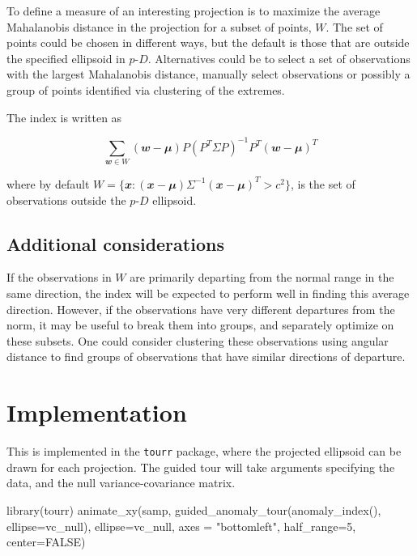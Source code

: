\documentclass[
  12pt]{article}
\newenvironment{Shaded}{\begin{snugshade}}{\end{snugshade}}
\newcommand{\AttributeTok}[1]{\textcolor[rgb]{0.40,0.45,0.13}{#1}}
\newcommand{\ConstantTok}[1]{\textcolor[rgb]{0.56,0.35,0.01}{#1}}
\newcommand{\DecValTok}[1]{\textcolor[rgb]{0.68,0.00,0.00}{#1}}
\newcommand{\FunctionTok}[1]{\textcolor[rgb]{0.28,0.35,0.67}{#1}}
\newcommand{\NormalTok}[1]{\textcolor[rgb]{0.00,0.23,0.31}{#1}}
\newcommand{\StringTok}[1]{\textcolor[rgb]{0.13,0.47,0.30}{#1}}
\newcommand\pD{$p\text{-}D$}
\begin{document}
To define a measure of an interesting projection is to maximize the
average Mahalanobis distance \citep{mahalanobis} in the projection for a
subset of points, \(W\). The set of points could be chosen in different
ways, but the default is those that are outside the specified ellipsoid
in \pD{}. Alternatives could be to select a set of observations with the
largest Mahalanobis distance, manually select observations or possibly a
group of points identified via clustering of the extremes.

The index is written as

\[
\sum_{\mathbfit{w} \in W} (\mathbfit{w} - \mathbfit{\mu}) P (P^T\Sigma P)^{-1}P^T(\mathbfit{w} - \mathbfit{\mu})^T
\]

where by default
\(W = \{\mathbfit{x}: (\mathbfit{x}-\mathbfit{\mu}) \Sigma^{-1}(\mathbfit{x}-\mathbfit{\mu})^T > c^2\}\),
is the set of observations outside the \pD{} ellipsoid.

\subsection{Additional considerations}\label{additional-considerations}

If the observations in \(W\) are primarily departing from the normal
range in the same direction, the index will be expected to perform well
in finding this average direction. However, if the observations have
very different departures from the norm, it may be useful to break them
into groups, and separately optimize on these subsets. One could
consider clustering these observations using angular distance to find
groups of observations that have similar directions of departure.

\section{Implementation}\label{implementation}

This is implemented in the \texttt{tourr} \citep{tourr, tourr-cran}
package, where the projected ellipsoid can be drawn for each projection.
The guided tour will take arguments specifying the data, and the null
variance-covariance matrix.

\begin{Shaded}
\begin{Highlighting}[]
\FunctionTok{library}\NormalTok{(tourr)}
\FunctionTok{animate\_xy}\NormalTok{(samp, }\FunctionTok{guided\_anomaly\_tour}\NormalTok{(}\FunctionTok{anomaly\_index}\NormalTok{(),}
  \AttributeTok{ellipse=}\NormalTok{vc\_null), }\AttributeTok{ellipse=}\NormalTok{vc\_null, }
  \AttributeTok{axes =} \StringTok{"bottomleft"}\NormalTok{, }\AttributeTok{half\_range=}\DecValTok{5}\NormalTok{, }\AttributeTok{center=}\ConstantTok{FALSE}\NormalTok{)}
\end{Highlighting}
\end{Shaded}
\end{document}
